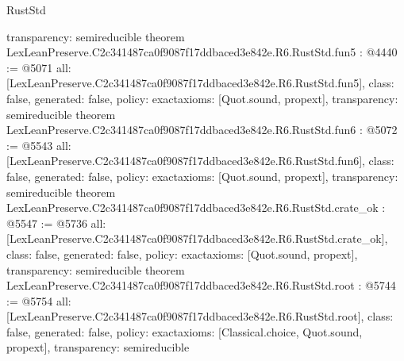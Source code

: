 \begin{lexlean}{RustStd}
\begin{coremodule}
{  transparency: semireducible
}
theorem LexLeanPreserve.C2c341487ca0f9087f17ddbaced3e842e.R6.RustStd.fun5 : @4440 := @5071 {
  all: [LexLeanPreserve.C2c341487ca0f9087f17ddbaced3e842e.R6.RustStd.fun5],
  class: false,
  generated: false,
  policy: exact{axioms: [Quot.sound, propext]},
  transparency: semireducible
}
theorem LexLeanPreserve.C2c341487ca0f9087f17ddbaced3e842e.R6.RustStd.fun6 : @5072 := @5543 {
  all: [LexLeanPreserve.C2c341487ca0f9087f17ddbaced3e842e.R6.RustStd.fun6],
  class: false,
  generated: false,
  policy: exact{axioms: [Quot.sound, propext]},
  transparency: semireducible
}
theorem LexLeanPreserve.C2c341487ca0f9087f17ddbaced3e842e.R6.RustStd.crate_ok : @5547 := @5736 {
  all: [LexLeanPreserve.C2c341487ca0f9087f17ddbaced3e842e.R6.RustStd.crate_ok],
  class: false,
  generated: false,
  policy: exact{axioms: [Quot.sound, propext]},
  transparency: semireducible
}
theorem LexLeanPreserve.C2c341487ca0f9087f17ddbaced3e842e.R6.RustStd.root : @5744 := @5754 {
  all: [LexLeanPreserve.C2c341487ca0f9087f17ddbaced3e842e.R6.RustStd.root],
  class: false,
  generated: false,
  policy: exact{axioms: [Classical.choice, Quot.sound, propext]},
  transparency: semireducible
}


\end{coremodule}
\end{lexlean}
